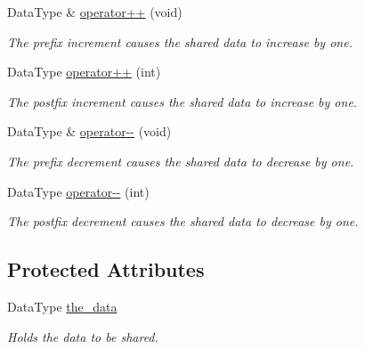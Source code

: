 \begin{DoxyCompactItemize}
Data\+Type \& \mbox{\hyperlink{class_task_share_a8c3b841652c2cde1bfb279aa5bfcc61f}{operator++}} (void)
\begin{DoxyCompactList}\small\item\em The prefix increment causes the shared data to increase by one. \end{DoxyCompactList}\item 
\mbox{\label{class_task_share_aaea5630111a55f864b7110456983e0fd}} 
Data\+Type \mbox{\hyperlink{class_task_share_aaea5630111a55f864b7110456983e0fd}{operator++}} (int)
\begin{DoxyCompactList}\small\item\em The postfix increment causes the shared data to increase by one. \end{DoxyCompactList}\item 
Data\+Type \& \mbox{\hyperlink{class_task_share_a79024a7661f8f48c5d2303a3fe121a32}{operator-\/-\/}} (void)
\begin{DoxyCompactList}\small\item\em The prefix decrement causes the shared data to decrease by one. \end{DoxyCompactList}\item 
\mbox{\label{class_task_share_a55276cb23f2ac2403ad36acf8f3625e3}} 
Data\+Type \mbox{\hyperlink{class_task_share_a55276cb23f2ac2403ad36acf8f3625e3}{operator-\/-\/}} (int)
\begin{DoxyCompactList}\small\item\em The postfix decrement causes the shared data to decrease by one. \end{DoxyCompactList}\end{DoxyCompactItemize}
\subsection*{Protected Attributes}
\begin{DoxyCompactItemize}
\item 
\mbox{\label{class_task_share_aa6a83a01a277f67bc5c1a3527b7c3425}} 
Data\+Type \mbox{\hyperlink{class_task_share_aa6a83a01a277f67bc5c1a3527b7c3425}{the\+\_\+data}}
\begin{DoxyCompactList}\small\item\em Holds the data to be shared. \end{DoxyCompactList}\end{DoxyCompactItemize}
